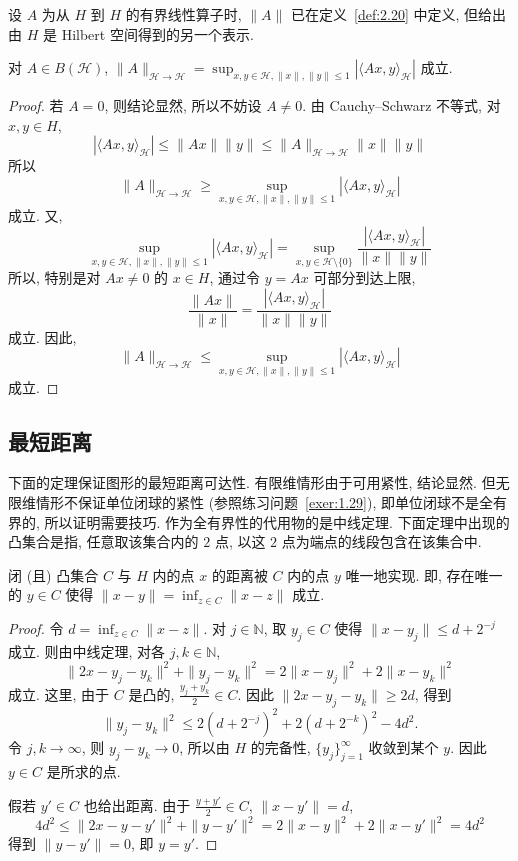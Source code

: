 设 $A$ 为从 $H$ 到 $H$ 的有界线性算子时, $\|A\|$ 已在定义~\ref{def:2.20} 中定义, 但给出由 $H$ 是 Hilbert 空间得到的另一个表示.

\begin{theorem}\label{thm:2.27}
对 $A \in B(\mathcal{H})$, $\|A\|_{\mathcal{H} \to \mathcal{H}} = \sup_{x, y \in \mathcal{H}, \|x\|, \|y\| \leq 1}|\langle Ax, y \rangle_{\mathcal{H}}|$ 成立.
\end{theorem}

\begin{proof}
若 $A = 0$, 则结论显然, 所以不妨设 $A \neq 0$. 由 Cauchy--Schwarz 不等式, 对 $x, y \in H$,
\[
|\langle Ax, y \rangle_{\mathcal{H}}| \leq \|Ax\|\|y\| \leq \|A\|_{\mathcal{H} \to \mathcal{H}}\|x\|\|y\|
\]
所以
\[
\|A\|_{\mathcal{H} \to \mathcal{H}} \geq \sup_{x, y \in \mathcal{H}, \|x\|, \|y\| \leq 1}|\langle Ax, y \rangle_{\mathcal{H}}|
\]
成立. 又,
\[
\sup_{x, y \in \mathcal{H}, \|x\|, \|y\| \leq 1}|\langle Ax, y \rangle_{\mathcal{H}}| = \sup_{x, y \in \mathcal{H} \setminus \{0\}}\frac{|\langle Ax, y \rangle_{\mathcal{H}}|}{\|x\|\|y\|}
\]
所以, 特别是对 $Ax \neq 0$ 的 $x \in H$, 通过令 $y = Ax$ 可部分到达上限,
\[
\frac{\|Ax\|}{\|x\|} = \frac{|\langle Ax, y \rangle_{\mathcal{H}}|}{\|x\|\|y\|}
\]
成立. 因此,
\[
\|A\|_{\mathcal{H} \to \mathcal{H}} \leq \sup_{x, y \in \mathcal{H}, \|x\|, \|y\| \leq 1}|\langle Ax, y \rangle_{\mathcal{H}}|
\]
成立.
\end{proof}

\subsection*{最短距离}

下面的定理保证图形的最短距离可达性. 有限维情形由于可用紧性, 结论显然. 但无限维情形不保证单位闭球的紧性 (参照练习问题~\ref{exer:1.29}), 即单位闭球不是全有界的, 所以证明需要技巧. 作为全有界性的代用物的是中线定理. 下面定理中出现的凸集合是指, 任意取该集合内的 $2$ 点, 以这 $2$ 点为端点的线段包含在该集合中.

\begin{theorem}\label{thm:2.28}
闭 (且) 凸集合 $C$ 与 $H$ 内的点 $x$ 的距离被 $C$ 内的点 $y$ 唯一地实现. 即, 存在唯一的 $y \in C$ 使得 $\|x - y\| = \inf_{z \in C}\|x - z\|$ 成立.
\end{theorem}

\begin{proof}
令 $d = \inf_{z \in C}\|x - z\|$. 对 $j \in \mathbb{N}$, 取 $y_{j} \in C$ 使得 $\|x - y_{j}\| \leq d + 2^{-j}$ 成立. 则由中线定理, 对各 $j, k \in \mathbb{N}$,
\[
\|2x - y_{j} - y_{k}\|^{2} + \|y_{j} - y_{k}\|^{2} = 2\|x - y_{j}\|^{2} + 2\|x - y_{k}\|^{2}
\]
成立. 这里, 由于 $C$ 是凸的, $\frac{y_{j} + y_{k}}{2} \in C$. 因此 $\|2x - y_{j} - y_{k}\| \geq 2d$, 得到
\[
\|y_{j} - y_{k}\|^{2} \leq 2(d + 2^{-j})^{2} + 2(d + 2^{-k})^{2} - 4d^{2}.
\]
令 $j, k \to \infty$, 则 $y_{j} - y_{k} \to 0$, 所以由 $H$ 的完备性, $\{y_{j}\}_{j=1}^{\infty}$ 收敛到某个 $y$. 因此 $y \in C$ 是所求的点.

假若 $y' \in C$ 也给出距离. 由于 $\frac{y + y'}{2} \in C$, $\|x - y'\| = d$,
\[
4d^{2} \leq \|2x - y - y'\|^{2} + \|y - y'\|^{2} = 2\|x - y\|^{2} + 2\|x - y'\|^{2} = 4d^{2}
\]
得到 $\|y - y'\| = 0$, 即 $y = y'$.
\end{proof}

